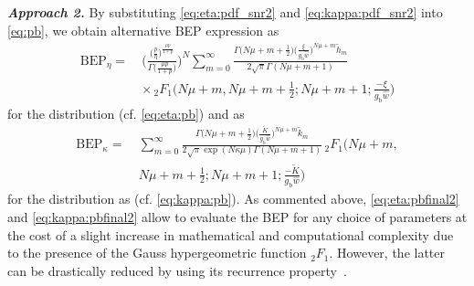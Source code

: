 \documentclass[journal,twocolumn]{IEEEtran}
\begin{document}
\textit{\textbf{Approach 2.}} By substituting \eqref{eq:eta:pdf_snr2} and \eqref{eq:kappa:pdf_snr2} into \eqref{eq:pb}, we obtain alternative \ac{BEP} expression as
\begin{align}
    \textrm{BEP}_{\eta} = \ & \Bigg( \frac{\big(\frac{p}{\eta }\big)^{\frac{\mu  p}{1+p}}}{\Gamma \big(\frac{\mu  p}{1+p}\big)} \Bigg)^N  \sum _{m=0}^{\infty } \frac{ \Gamma \big(N \mu \! + \! m \! + \! \frac{1}{2}\big) \big(\frac{\xi}{g_{\textrm{b}} \hat{w}}\big)^{N \mu + m} \tilde{h}_m}{ 2\sqrt{\pi} \Gamma (N \mu + m + 1)} \nonumber\\
    &\times \, _2F_1 \bigg(N \mu \! + \! m,N \mu \!+\! m\!+\!\frac{1}{2};N \mu \! + \!m+1;\frac{ -\xi }{g_{\textrm{b}} \hat{w} }\bigg) \label{eq:eta:pbfinal2}
\end{align}
for the \Ehm{} distribution (cf. \eqref{eq:eta:pb}) and as
\begin{align}
    \textrm{BEP}_{\kappa} = \ & \sum _{m=0}^{\infty } \frac{ \Gamma \big(N \mu \! + \! m \! + \!\frac{1}{2}\big) \big(\frac{\tilde{K}}{g_{\textrm{b}} \hat{w}}\big)^{N \mu + m} \tilde{k}_m}{ 2\sqrt{\pi} \exp(N\kappa\mu) \Gamma (N \mu \!+ \!m \! + \! 1)} \, _2F_1\bigg(N \mu \! + \! m, \nonumber \\
    & N \mu + m+\frac{1}{2};N \mu + m+1;\frac{ -\tilde{K} }{g_{\textrm{b}}  \hat{w} }\bigg) \label{eq:kappa:pbfinal2}
\end{align}
for the \km{} distribution as (cf. \eqref{eq:kappa:pb}). As commented above, \eqref{eq:eta:pbfinal2} and \eqref{eq:kappa:pbfinal2} allow to evaluate the \ac{BEP} for any choice of parameters at the cost of a slight increase in mathematical and computational complexity due to the presence of the Gauss hypergeometric function $_2F_1$. However, the latter can be drastically reduced by using its recurrence property~\cite[Eq. (15.5.E19)]{NIST:DLMF}.  


\smallskip
\end{document}
